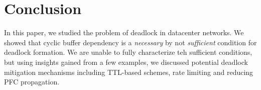 \secspacelarge
\section{Conclusion}
\secspace

In this paper, we studied the problem of deadlock in datacenter networks.  We
showed that cyclic buffer dependency is a {\em necessary} by not {\em
sufficient} condition for deadlock formation. We are unable to fully characterize
teh sufficient conditions, but using insights gained from a few examples, we
discussed potential deadlock mitigation mechanisms including TTL-based schemes,
rate limiting and reducing PFC propagation.

